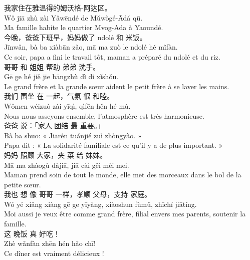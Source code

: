 \documentclass[11pt]{article}
\begin{document}
\begin{textebox}
我家住在雅温得的姆沃格-阿达区。\\ 
Wǒ jiā zhù zài Yǎwēndé de Mǔwògé-Ādá qū.\\
Ma famille habite le quartier Mvog-Ada à Yaoundé.\\

今晚，爸爸下班早，妈妈做了 ndolé 和 米饭。\\ 
Jīnwǎn, bà ba xiàbān zǎo, mā ma zuò le ndolé hé mǐfàn.\\
Ce soir, papa a fini le travail tôt, maman a préparé du ndolé et du riz.\\

哥哥 和 姐姐 帮助 弟弟 洗手。\\ 
Gē ge hé jiě jie bāngzhù dì di xǐshǒu.\\
Le grand frère et la grande sœur aident le petit frère à se laver les mains.\\

我们 围坐 在 一起，气氛 很 和睦。\\ 
Wǒmen wéizuò zài yīqì, qìfēn hěn hé mù.\\
Nous nous asseyons ensemble, l'atmosphère est très harmonieuse.\\

爸爸 说：「家人 团结 最 重要。」\\ 
Bà ba shuō: « Jiārén tuánjié zuì zhòngyào. »\\
Papa dit : « La solidarité familiale est ce qu'il y a de plus important. »\\

妈妈 照顾 大家，夹 菜 给 妹妹。\\ 
Mā ma zhàogù dàjiā, jiā cài gěi mèi mei.\\
Maman prend soin de tout le monde, elle met des morceaux dans le bol de la petite sœur.\\

我也 想 像 哥哥 一样，孝顺 父母，支持 家庭。\\ 
Wó yé xiǎng xiàng gē ge yīyàng, xiàoshun fùmǔ, zhīchí jiātíng.\\
Moi aussi je veux être comme grand frère, filial envers mes parents, soutenir la famille.\\

这 晚饭 真 好吃！\\ 
Zhè wǎnfàn zhēn hén hǎo chī!\\
Ce dîner est vraiment délicieux !
\end{textebox}
\end{document}
